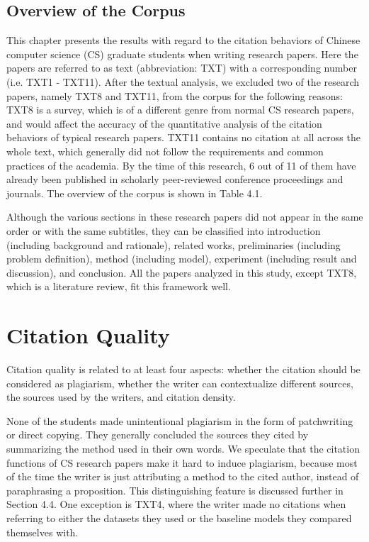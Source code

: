 
\subsection{Overview of the Corpus}
This chapter presents the results with regard to the citation behaviors of Chinese computer science (CS) graduate students when writing research papers. Here the papers are referred to as text (abbreviation: TXT) with a corresponding number (i.e. TXT1 - TXT11). After the textual analysis, we excluded two of the research papers, namely TXT8 and TXT11, from the corpus for the following reasons: TXT8 is a survey, which is of a different genre from normal CS research papers, and would affect the accuracy of the quantitative analysis of the citation behaviors of typical research papers. TXT11 contains no citation at all across the whole text, which generally did not follow the requirements and common practices of the academia. By the time of this research, 6 out of 11 of them have already been published in scholarly peer-reviewed conference proceedings and journals. The overview of the corpus is shown in Table 4.1.


Although the various sections in these research papers did not appear in the same order or with the same subtitles, they can be classified into introduction (including background and rationale), related works, preliminaries (including problem definition), method (including model), experiment (including result and discussion), and conclusion. All the papers analyzed in this study, except TXT8, which is a literature review, fit this framework well.

\section{Citation Quality}
Citation quality is related to at least four aspects: whether the citation should be considered as plagiarism, whether the writer can contextualize different sources, the sources used by the writers, and citation density.

None of the students made unintentional plagiarism in the form of patchwriting or direct copying. They generally concluded the sources they cited by summarizing the method used in their own words. We speculate that the citation functions of CS research papers make it hard to induce plagiarism, because most of the time the writer is just attributing a method to the cited author, instead of paraphrasing a proposition. This distinguishing feature is discussed further in Section 4.4. One exception is TXT4, where the writer made no citations when referring to either the datasets they used or the baseline models they compared themselves with.

